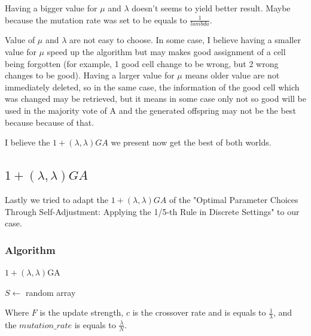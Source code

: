 \documentclass[12pt]{article}
\theoremstyle{definition}
\theoremstyle{plain}
\theoremstyle{remark}
\begin{document}
Having a bigger value for $\mu$ and $\lambda$ doesn't seems to yield better result. Maybe because the mutation rate was set to be equals to $\frac{1}{lambda}$.

Value of $\mu$ and $\lambda$ are not easy to choose. In some case, I believe having a smaller value for $\mu$ speed up the algorithm but may makes good assignment of a cell being forgotten (for example, 1 good cell change to be wrong, but 2 wrong changes to be good). Having a larger value for $\mu$ means older value are not immediately deleted, so in the same case, the information of the good cell which was changed may be retrieved, but it means in some case only not so good will be used in the majority vote of A and the generated offspring may not be the best because because of that.

I believe the $1 + (\lambda, \lambda)GA$ we present now get the best of both worlds.

\subsection{$1 + (\lambda, \lambda)GA$}
Lastly we tried to adapt the $1 + (\lambda, \lambda)GA$ of the "Optimal Parameter Choices Through Self-Adjustment: Applying the 1/5-th Rule in Discrete Settings" to our case.

\subsubsection{Algorithm}
\begin{algorithm}[H]
	\caption{$1 + (\lambda, \lambda)$GA}
	$S \leftarrow$ random array\\
\end{algorithm}
\fi
Where $F$ is the update strength, $c$ is the crossover rate and is equals to $\frac{1}{\lambda}$, and the $mutation\_rate$ is equals to $\frac{\lambda}{N}$.
\end{document}
